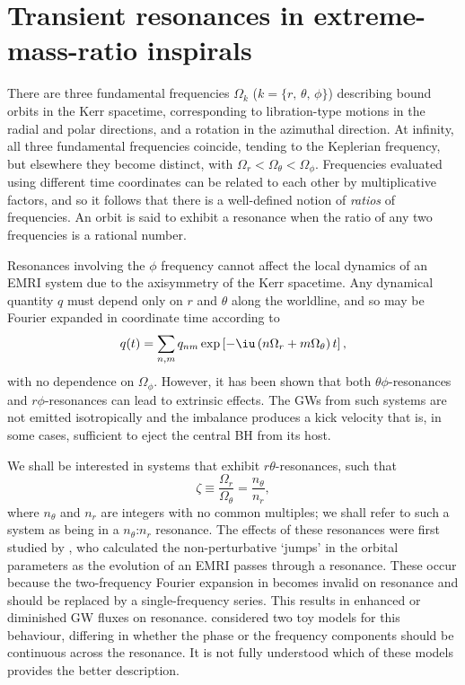 \chapter[Transient resonances in EMRIs]{Transient resonances in extreme-mass-ratio inspirals}\label{ch:resonances}

There are three fundamental frequencies $\Omega_k$ ($k=\{r,\,\theta,\,\phi\}$) describing bound orbits in the Kerr spacetime, corresponding to libration-type motions in the radial and polar directions, and a rotation in the azimuthal direction. At infinity, all three fundamental frequencies coincide, tending to the Keplerian frequency, but elsewhere they become distinct, with $\Omega_r < \Omega_\theta < \Omega_\phi$. Frequencies evaluated using different time coordinates can be related to each other by multiplicative factors, and so it follows that there is a well-defined notion of \textit{ratios} of frequencies. An orbit is said to exhibit a resonance when the ratio of any two frequencies is a rational number.

Resonances involving the $\phi$ frequency cannot affect the local dynamics of an EMRI system due to the axisymmetry of the Kerr spacetime. Any dynamical quantity $q$ must depend only on $r$ and $\theta$ along the worldline, and so may be Fourier expanded in coordinate time according to
\begin{equation}
\label{eq:res-dynamical-exp}
q(t) = \sum_{n,m} q_{nm} \exp\left[-\iu\left( n\Omega_r + m\Omega_\theta \right)t\right],
\end{equation}
with no dependence on $\Omega_\phi$. However, it has been shown that both $\theta\phi$-resonances \citep{hirata_resonant_2011} and $r\phi$-resonances \citep{van_de_meent_resonantly_2014} can lead to extrinsic effects. The GWs from such systems are not emitted isotropically and the imbalance produces a kick velocity that is, in some cases, sufficient to eject the central BH from its host.

We shall be interested in systems that exhibit $r\theta$-resonances, such that
\begin{equation}
\label{eq:res-def}
\zeta \equiv \frac{\Omega_r}{\Omega_\theta} = \frac{n_\theta}{n_r},
\end{equation}
where $n_\theta$ and $n_r$ are integers with no common multiples; we shall refer to such a system as being in a $n_\theta$:$n_r$ resonance. The effects of these resonances were first studied by \citet{flanagan_transient_2012}, who calculated the non-perturbative `jumps' in the orbital parameters as the evolution of an EMRI passes through a resonance. These occur because the two-frequency Fourier expansion in  becomes invalid on resonance and should be replaced by a single-frequency series. This results in enhanced or diminished GW fluxes on resonance.  considered two toy models for this behaviour, differing in whether the phase or the frequency components should be continuous across the resonance. It is not fully understood which of these models provides the better description.

